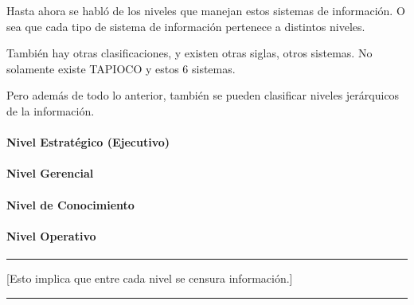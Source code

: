 Hasta ahora se habló de los niveles que manejan estos sistemas de
información. O sea que cada tipo de sistema de información pertenece a
distintos niveles.

También hay otras clasificaciones, y existen otras siglas, otros
sistemas. No solamente existe TAPIOCO y estos 6 sistemas.

Pero además de todo lo anterior, también se pueden clasificar niveles
jerárquicos de la información.

\paragraph{Nivel Estratégico (Ejecutivo)}
\paragraph{Nivel Gerencial}
\paragraph{Nivel de Conocimiento}
\paragraph{Nivel Operativo}

\begin{center}\rule{0.5\linewidth}{0.5pt}\end{center}




[Esto implica que entre cada nivel se censura información.]

\begin{center}\rule{0.5\linewidth}{0.5pt}\end{center}

\bigskip \bigskip \bigskip



